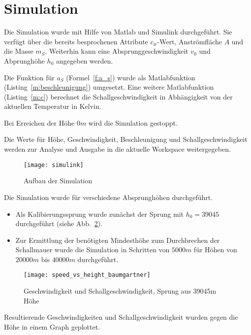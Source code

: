 \section{Simulation}\label{sec:simulation}

Die Simulation wurde mit Hilfe von Matlab und Simulink durchgeführt.
Sie verfügt über die bereits besprochenen Attribute $c_w$-Wert, Anströmfläche $A$ und die Masse $m_S$. Weiterhin kann eine Absprunggeschwindigkeit $v_0$ und Abprunghöhe $h_0$ angegeben werden.

Die Funktion für $a_S$ (Formel~\ref{f:a_s}) wurde als Matlabfunktion (Listing~\ref{m:beschleunigung}) umgesetzt.
Eine weitere Matlabfunktion (Listing~\ref{m:c}) berechnet die Schallgeschwindigkeit in Abhängigkeit von der aktuellen Temperatur in Kelvin.





Bei Erreichen der Höhe $0m$ wird die Simulation gestoppt.

Die Werte für Höhe, Geschwindigkeit, Beschleunigung und Schallgeschwindigkeit werden zur Analyse und Ausgabe in die aktuelle Workspace weitergegeben.

\begin{figure}[h]
  \centering
  \texttt{[image: simulink]}
  \caption{Aufbau der Simulation}
  \label{fig:simulink}
\end{figure}

Die Simulation wurde für verschiedene Absprunghöhen durchgeführt.
\begin{itemize}
  \item Als Kalibierungssprung wurde zunächst der Sprung mit $h_0=39045$ durchgeführt (siehe Abb.~\ref{fig:39045}).
  \item Zur Ermittlung der benötigten Mindesthöhe zum Durchbrechen der Schallmauer wurde die Simulation in Schritten von $5000m$ für Höhen von $20000m$ bis $40000m$ durchgeführt.
\end{itemize}

\begin{figure}[h]
  \centering
  \texttt{[image: speed\_vs\_height\_baumgartner]}
  \caption{Geschwindigkeit und Schallgeschwindigkeit, Sprung aus 39045m Höhe}
  \label{fig:39045}
\end{figure}

Resultierende Geschwindigkeiten und Schallgeschwindigkeit wurden gegen die Höhe in einem Graph geplottet.
